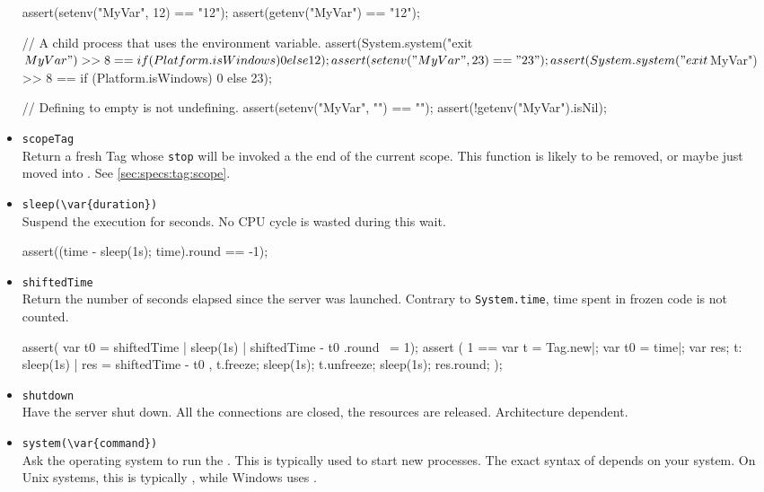 \begin{itemize}
\begin{urbiscript}[firstnumber=last]
assert(setenv("MyVar", 12) == "12");
assert(getenv("MyVar") == "12");

// A child process that uses the environment variable.
assert(System.system("exit $MyVar") >> 8 ==
       {if (Platform.isWindows) 0 else 12});
assert(setenv("MyVar", 23) == "23");
assert(System.system("exit $MyVar") >> 8 ==
       {if (Platform.isWindows) 0 else 23});

// Defining to empty is not undefining.
assert(setenv("MyVar", "") == "");
assert(!getenv("MyVar").isNil);
\end{urbiscript}

\item \lstinline|scopeTag|\\
  Return a fresh Tag whose \lstinline|stop| will be invoked a the end
  of the current scope.  This function is likely to be removed, or
  maybe just moved into .  See
  \autoref{sec:specs:tag:scope}.

\item \lstinline|sleep(\var{duration})|\\
  Suspend the execution for  seconds.  No CPU cycle is
  wasted during this wait.

\begin{urbiscript}[firstnumber=last]
assert((time - {sleep(1s); time}).round == -1);
\end{urbiscript}

\item \lstinline|shiftedTime|\\
  Return the number of seconds elapsed since the \urbi server was
  launched.  Contrary to \lstinline|System.time|, time spent in frozen
  code is not counted.
\begin{urbiscript}[firstnumber=last]
assert({ var t0 = shiftedTime | sleep(1s) | shiftedTime - t0 }.round ~= 1);
assert (
  1 ==
  {
    var t = Tag.new|;
    var t0 = time|;
    var res;
    t: { sleep(1s) | res = shiftedTime - t0 },
    t.freeze;
    sleep(1s);
    t.unfreeze;
    sleep(1s);
    res.round;
  });
\end{urbiscript}

\item \lstinline|shutdown|\\
  Have the \urbi server shut down.  All the connections are closed,
  the resources are released.  Architecture dependent.

\item \lstinline|system(\var{command})|\\
  Ask the operating system to run the .  This is
  typically used to start new processes.  The exact syntax of
   depends on your system.  On Unix systems, this is
  typically , while Windows uses .


\end{itemize}
